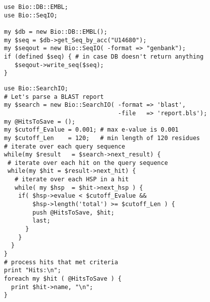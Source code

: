 \documentclass[12pt]{article}
\begin{document}

\begin{figure}[ht]
\centerline{}
\end{figure}

\newpage

\begin{verbatim}
use Bio::DB::EMBL;
use Bio::SeqIO;

my $db = new Bio::DB::EMBL();
my $seq = $db->get_Seq_by_acc("U14680");
my $seqout = new Bio::SeqIO( -format => "genbank");
if (defined $seq) { # in case DB doesn't return anything
   $seqout->write_seq($seq);
}
\end{verbatim}

\newpage

\begin{verbatim}
use Bio::SearchIO;
# Let's parse a BLAST report 
my $search = new Bio::SearchIO( -format => 'blast',
                                -file   => 'report.bls');
my @HitsToSave = ();
my $cutoff_Evalue = 0.001; # max e-value is 0.001
my $cutoff_Len    = 120;   # min length of 120 residues
# iterate over each query sequence
while(my $result   = $search->next_result) {
 # iterate over each hit on the query sequence
 while(my $hit = $result->next_hit) {
   # iterate over each HSP in a hit
   while( my $hsp  = $hit->next_hsp ) {
    if( $hsp->evalue < $cutoff_Evalue && 
        $hsp->length('total') >= $cutoff_Len ) { 
        push @HitsToSave, $hit;
        last;
      } 
    }
  }
}
# process hits that met criteria
print "Hits:\n";
foreach my $hit ( @HitsToSave ) {
  print $hit->name, "\n";	
}

\end{verbatim}
\end{document}

